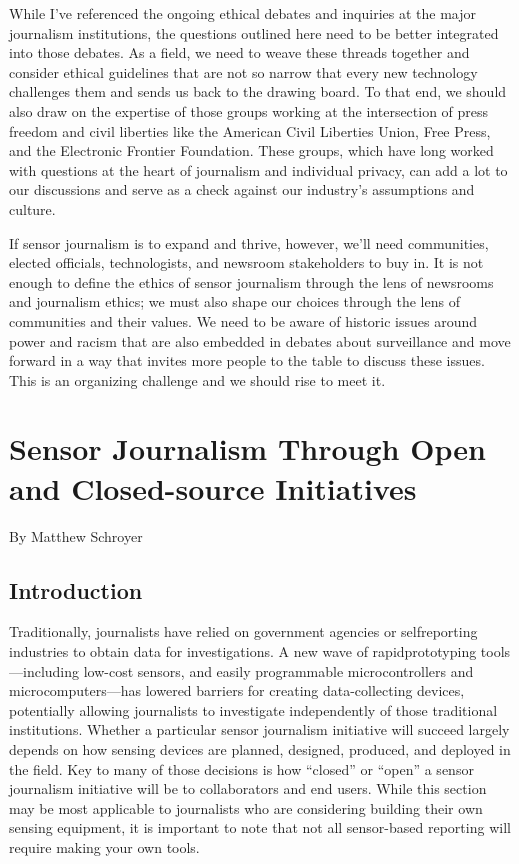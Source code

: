 \begin{itemize}
While I've referenced the ongoing ethical debates and inquiries at the
major journalism institutions, the questions outlined here need to be better
integrated into those debates. As a field, we need to weave these threads
together and consider ethical guidelines that are not so narrow that every
new technology challenges them and sends us back to the drawing board.
To that end, we should also draw on the expertise of those groups working
at the intersection of press freedom and civil liberties like the American
Civil Liberties Union, Free Press, and the Electronic Frontier Foundation.
These groups, which have long worked with questions at the heart of journalism
and individual privacy, can add a lot to our discussions and serve as
a check against our industry's assumptions and culture.

If sensor journalism is to expand and thrive, however, we'll need communities,
elected officials, technologists, and newsroom stakeholders to buy in.
It is not enough to define the ethics of sensor journalism through the lens of
newsrooms and journalism ethics; we must also shape our choices through
the lens of communities and their values. We need to be aware of historic issues around power and racism that are also embedded in debates about surveillance and move forward in a way that invites more people to the table
to discuss these issues. This is an organizing challenge and we should rise
to meet it.

\chapter{Sensor Journalism Through Open and Closed-source Initiatives}
By Matthew Schroyer

\section{Introduction}
Traditionally, journalists have relied on government agencies or selfreporting
industries to obtain data for investigations. A new wave of rapidprototyping
tools—including low-cost sensors, and easily programmable
microcontrollers and microcomputers—has lowered barriers for creating
data-collecting devices, potentially allowing journalists to investigate independently
of those traditional institutions. Whether a particular sensor
journalism initiative will succeed largely depends on how sensing devices
are planned, designed, produced, and deployed in the field. Key to many of
those decisions is how ``closed'' or ``open'' a sensor journalism initiative will
be to collaborators and end users. While this section may be most applicable
to journalists who are considering building their own sensing equipment,
it is important to note that not all sensor-based reporting will require
making your own tools.


\end{itemize}
